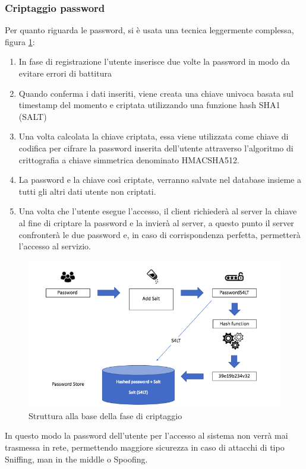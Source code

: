 \documentclass[a4paper,final,12pt]{report}
\begin{document}
\subsubsection{Criptaggio password} 
Per quanto riguarda le password, si è usata una tecnica leggermente complessa, figura \ref{figura:crppassconsalt}:
\begin{enumerate}
\item In fase di registrazione l'utente inserisce due volte la password in modo da evitare errori di battitura
\item Quando conferma i dati inseriti, viene creata una chiave univoca basata sul timestamp del momento e criptata utilizzando una funzione hash SHA1 (SALT)
\item Una volta calcolata la chiave criptata, essa viene utilizzata come chiave di codifica per cifrare la password inserita dell'utente attraverso l'algoritmo di crittografia a chiave simmetrica denominato HMACSHA512. 
\item La password e  la chiave così criptate, verranno salvate nel database insieme a tutti gli altri dati utente non criptati. 
\item Una volta che l'utente esegue l'accesso, il client richiederà al server la chiave al fine di criptare la password e la invierà al server, a questo punto il server confronterà le due password e, in caso di corrispondenza perfetta, permetterà l'accesso al servizio.
\end{enumerate}
\begin{figure}[hbtp]
\centering
\includegraphics[scale=0.50]{img_concettuale/sale.png}
\caption{Struttura alla base della fase di criptaggio \cite{okta}}
\label{figura:crppassconsalt}
\end{figure}
In questo modo la password dell'utente per l'accesso al sistema non verrà mai trasmessa in rete, permettendo maggiore sicurezza in caso di attacchi di tipo Sniffing, man in the middle o Spoofing.  
\end{document}
